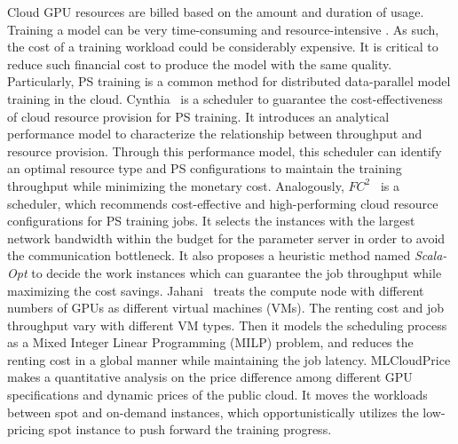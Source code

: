 Cloud GPU resources are billed based on the amount and duration of usage. Training a model can be very time-consuming and resource-intensive {\tiny{}}. As such, the cost of a training workload could be considerably expensive. It is critical to reduce such financial cost to produce the model with the same quality. Particularly, PS training is a common method for distributed data-parallel model training in the cloud.
Cynthia~\cite{Cynthia} is a scheduler to guarantee the cost-effectiveness of cloud resource provision for PS training. It introduces an analytical performance model to characterize the relationship between throughput and resource provision. Through this performance model, this scheduler can identify an optimal resource type and PS configurations to maintain the training throughput while minimizing the monetary cost.
Analogously, $FC^2$~\cite{FC2} is a scheduler, which recommends cost-effective and high-performing cloud resource configurations for PS training jobs. It selects the instances with the largest network bandwidth within the budget for the parameter server in order to avoid the communication bottleneck. It also proposes a heuristic method named \emph{Scala-Opt} to decide the work instances which can guarantee the job throughput while maximizing the cost savings.
Jahani~\cite{Jahani} treats the compute node with different numbers of GPUs as different virtual machines (VMs). The renting cost and job throughput vary with different VM types.
Then it models the scheduling process as a Mixed Integer Linear Programming (MILP) problem, and reduces the renting cost in a global manner while maintaining the job latency.
MLCloudPrice \cite{MLCloudPrice} makes a quantitative analysis on the price difference among different GPU specifications and dynamic prices of the public cloud. It moves the workloads between spot and on-demand instances, which opportunistically utilizes the low-pricing spot instance to push forward the training progress.










